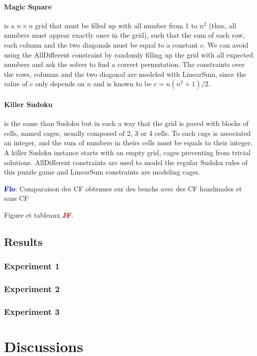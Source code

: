 \documentclass{article}
\newcommand{\flo}{\textcolor{blue}{\bf Flo}\xspace}
\newcommand{\jf}{\textcolor{red}{\bf JF}\xspace}
\begin{document}
\paragraph{Magic Square} is a $n \times n$ grid that must be filled up
with all number from 1 to $n^2$ (thus, all numbers must appear exactly
once in the grid), such that the  sum of each row, each column and the
two diagonals must be equal to a constant $c$.  We can avoid using the
AllDifferent  constraint by  randomly  filling up  the  grid with  all
expected numbers and ask the solver to find a correct permutation. The
constraints over  the rows, columns  and the two diagonal  are modeled
with LinearSum,  since the  value of  $c$ only depends  on $n$  and is
known to be $c = n(n^2 + 1)/2$.

\paragraph{Killer Sudoku}  is the same than  Sudoku but in such  a way
that the  grid is  paved with  blocks of  cells, named  cages, usually
composed of 2, 3  or 4 cells.  To each cage  is associated an integer,
and  the sum  of  numbers in  theirs  cells must  be  equals to  their
integer. A  killer Sudoku  instance starts with  an empty  grid, cages
preventing from  trivial solutions. AllDifferent constraints  are used
to model  the regular Sudoku rules  of this puzzle game  and LinearSum
constraints are modeling cages.

\flo: Comparaison des  CF obtenues sur des  benchs avec des CF  handmades et
sans CF


Figure et tableaux \jf.

\subsection{Results}

\subsubsection{Experiment 1}
\subsubsection{Experiment 2}
\subsubsection{Experiment 3}


\section{Discussions}
\end{document}
